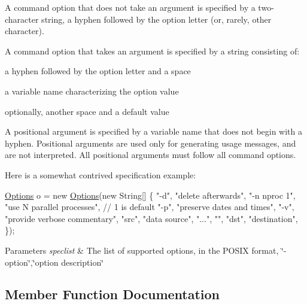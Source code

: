 A command option that does not take an argument is specified by a two-\/character string, a hyphen followed by the option letter (or, rarely, other character).

A command option that takes an argument is specified by a string consisting of\+: 
\begin{DoxyItemize}
\item a hyphen followed by the option letter and a space 
\item a variable name characterizing the option value 
\item optionally, another space and a default value 
\end{DoxyItemize}

A positional argument is specified by a variable name that does not begin with a hyphen. Positional arguments are used only for generating usage messages, and are not interpreted. All positional arguments must follow all command options.

Here is a somewhat contrived specification example\+: 
\begin{DoxyPre}
 \hyperlink{classit_1_1polito_1_1elite_1_1enocean_1_1examples_1_1util_1_1_options}{Options} o = new \hyperlink{classit_1_1polito_1_1elite_1_1enocean_1_1examples_1_1util_1_1_options}{Options}(new String[] \{
    "-d",       "delete afterwards",
    "-n nproc 1",   "use N parallel processes", // 1 is default
    "-p",       "preserve dates and times",
    "-v",       "provide verbose commentary",
    "src",      "data source",
    "...",      "",
    "dst",      "destination",
 \});
 \end{DoxyPre}



\begin{DoxyParams}{Parameters}
{\em speclist} & The list of supported options, in the P\+O\+S\+IX format, \char`\"{}-\/option\char`\"{},\char`\"{}option
description\char`\"{} \\
\hline
\end{DoxyParams}


\subsection{Member Function Documentation}
\hypertarget{classit_1_1polito_1_1elite_1_1enocean_1_1examples_1_1util_1_1_options_a2fc9d29475324ffb5cbc5306951a007a}{}\label{classit_1_1polito_1_1elite_1_1enocean_1_1examples_1_1util_1_1_options_a2fc9d29475324ffb5cbc5306951a007a} 
